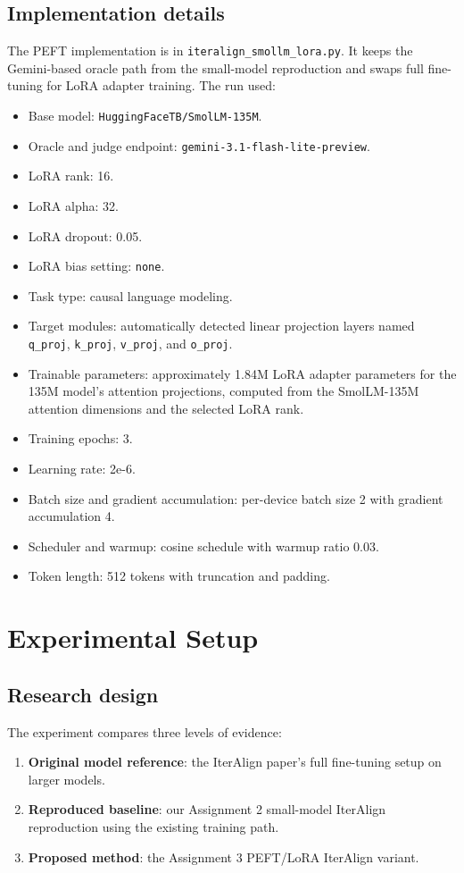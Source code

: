 \documentclass[11pt]{article}
\begin{document}
\subsection{Implementation details}
The PEFT implementation is in \texttt{iteralign\_smollm\_lora.py}. It keeps the Gemini-based oracle path from the small-model reproduction and swaps full fine-tuning for LoRA adapter training. The run used:
\begin{itemize}
  \item Base model: \texttt{HuggingFaceTB/SmolLM-135M}.
  \item Oracle and judge endpoint: \texttt{gemini-3.1-flash-lite-preview}.
  \item LoRA rank: 16.
  \item LoRA alpha: 32.
  \item LoRA dropout: 0.05.
  \item LoRA bias setting: \texttt{none}.
  \item Task type: causal language modeling.
  \item Target modules: automatically detected linear projection layers named \texttt{q\_proj}, \texttt{k\_proj}, \texttt{v\_proj}, and \texttt{o\_proj}.
  \item Trainable parameters: approximately 1.84M LoRA adapter parameters for the 135M model's attention projections, computed from the SmolLM-135M attention dimensions and the selected LoRA rank.
  \item Training epochs: 3.
  \item Learning rate: 2e-6.
  \item Batch size and gradient accumulation: per-device batch size 2 with gradient accumulation 4.
  \item Scheduler and warmup: cosine schedule with warmup ratio 0.03.
  \item Token length: 512 tokens with truncation and padding.
\end{itemize}

\section{Experimental Setup}
\label{sec:setup}

\subsection{Research design}
The experiment compares three levels of evidence:
\begin{enumerate}
  \item \textbf{Original model reference}: the IterAlign paper's full fine-tuning setup on larger models.
  \item \textbf{Reproduced baseline}: our Assignment 2 small-model IterAlign reproduction using the existing training path.
  \item \textbf{Proposed method}: the Assignment 3 PEFT/LoRA IterAlign variant.
\end{enumerate}
\end{document}
